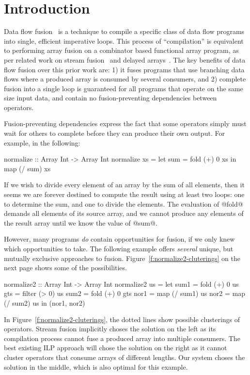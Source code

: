 \section{Introduction}

Data flow fusion~\cite{lippmeier2013flow} is a technique to compile a specific class of data flow programs into single, efficient imperative loops. This process of ``compilation'' is equivalent to performing array fusion on a combinator based functional array program, as per related work on stream fusion~\cite{coutts2007streamfusion} and delayed arrays~\cite{keller2010repa}. The key benefits of data flow fusion over this prior work are: 1) it fuses programs that use branching data flows where a produced array is consumed by several consumers, and 2) complete fusion into a single loop is guaranteed for all programs that operate on the same size input data, and contain no fusion-preventing dependencies between operators.

Fusion-preventing dependencies express the fact that some operators simply must wait for others to complete before they can produce their own output. For example, in the following:
\begin{code}
  normalize :: Array Int -> Array Int
  normalize xs = let sum = fold (+) 0 xs
                 in  map (/ sum) xs
\end{code}

If we wish to divide every element of an array by the sum of all elements, then it seems we are forever destined to compute the result using at least two loops: one to determine the sum, and one to divide the elements. The evaluation of @fold@ demands all elements of its source array, and we cannot produce any elements of the result array until we know the value of @sum@. 

However, many programs \emph{do} contain opportunities for fusion, if we only knew which opportunities to take. The following example offers \emph{several} unique, but mutually exclusive approaches to fusion. Figure~\ref{f:normalize2-cluterings} on the next page shows some of the possibilities.
\begin{code}
 normalize2 :: Array Int -> Array Int
 normalize2 us
  = let sum1 = fold   (+)  0   us
        gts  = filter (> 0)    us
        sum2 = fold   (+)  0   gts
        nor1 = map    (/ sum1) us
        nor2 = map    (/ sum2) us
    in (nor1, nor2)
\end{code}

In Figure~\ref{f:normalize2-cluterings}, the dotted lines show possible clusterings of operators. Stream fusion implicitly choses the solution on the left as its compilation process cannot fuse a produced array into multiple consumers. The best existing ILP approach will chose the solution on the right as it cannot cluster operators that consume arrays of different lengths. Our system choses the solution in the middle, which is also optimal for this example. 

